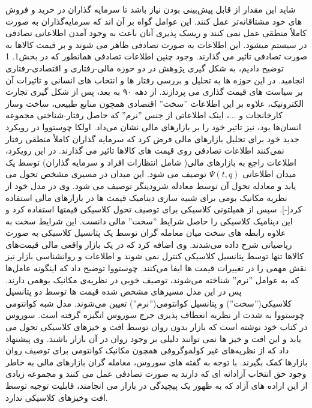 \documentclass[a4paper,titlepage,12pt,fleqn,oneside]{report}
\begin{document}
	شاید این مقدار از قابل پیش‌بینی بودن نیاز باشد تا سرمایه گذاران در خرید و فروش های خود مشتاقانه‌تر عمل کنند.  این عوامل گواه بر آن اند که سرمایه‌گذاران به صورت کاملاً منطقی عمل نمی کنند و ریسک پذیری آنان باعث به وجود آمدن اطلاعاتی تصادفی در سیستم میشود.  این اطلاعات به صورت تصادفی ظاهر می شوند و بر قیمت کالاها به صورت تصادفی تاثیر می گذارند.  وجود چنین اطلاعات تصادفی  همانطور که در بخش1. 1 توضیح دادیم، به شکل گیری پژوهش در دو حوزه مالی-رفتاری و اقتصادی-رفتاری انجامید. در این حوزه ها به تحلیل و بررسی رفتار ها و انتخاب های انسانی و تاثیرات آن بر سیاست های قیمت گذاری می پردازند. از دهه ۹۰ به بعد، پس از شکل گیری تجارت الکترونیک، علاوه بر این اطلاعات ''سخت'' اقتصادی همچون منابع  طبیعی، ساخت وساز کارخانجات و ...، اینک اطلاعاتی از جنس ''نرم'' که حاصل رفتار-شناختی مجموعه انسان‌ها بود،  نیز تاثیر خود را بر بازارهای مالی نشان می‌داد.  اولکا چوستووا در رویکرد جدید خود برای تحلیل بازارهای مالی فرض کرد که سرمایه گذاران کاملاً منطقی رفتار نمی‌کنند اطلاعات تصادفی روی قیمت های کالاها تاثیر می گذارند.  در این رویکرد،  اطلاعات راجع به بازارهای مالی( شامل انتظارات افراد و سرمایه گذاران)  توسط یک میدان اطلاعاتی $\Psi(t,q)$  توصیف می شود.  این میدان در مسیری مشخص تحول می یابد و معادله تحول آن توسط معادله شرودینگر توصیف می شود.  وی در مدل خود از نظریه مکانیک بومی برای  شبیه سازی دینامیک قیمت ها در بازارهای مالی استفاده کرد[-].  سپس از همیلتونی کلاسیکی برای توصیف تحول کلاسیکی قیمتها استفاده کرد و  این دینامیک کلاسیکی را حاصل شرایط ''سخت'' مالی دانست.  این شرایط سخت به علاوه رابطه های سخت میان معامله گران توسط یک پتانسیل کلاسیکی به صورت ریاضیاتی شرح داده می‌شدند.  وی اضافه کرد که در یک بازار واقعی مالی قیمت‌های کالاها تنها توسط پتانسیل کلاسیکی کنترل نمی شوند و اطلاعات و روانشناسی بازار نیز نقش مهمی را در تغییرات قیمت ها ایفا می‌کنند. چوستووا  توضیح داد که اینگونه عامل‌ها که به عوامل ''نرم'' شناخته می‌شوند، توصیف خوبی در نظریه‌ی مکانیک بوهمی ‌دارند.  پس در این مدل مسیرهای مشخص شده قیمت ها توسط دو پتانسیل کلاسیکی(''سخت'')  و پتانسیل کوانتومی(''نرم'') تعیین می‌شوند.  مدل شبه کوانتومی چوستووا به شدت از نظریه انعطاف پذیری جرج سوروس انگیزه گرفته است. سوروس در کتاب خود نوشته است که بازار بدون روان توسط افت و خیزهای کلاسیکی تحول می یابد و این افت و خیز ها نمی توانند دلیلی بر وجود روان در آن بازار باشند. وی  پیشنهاد داد که از نظریه‌های غیر کولموگروفی همچون مکانیک کوانتومی برای توصیف روان بازارها کمک بگیرند.   با توجه به گفته های سوروس،  معامله گران بازارهای مالی به خاطر وجود حق انتخاب آزادانه ای که دارند به صورت تصادفی عمل می کنند  و مجموعه زیادی از این اراده های آزاد که به ظهور یک پیچیدگی در بازار می انجامند، قابلیت توجیه توسط افت وخیزهای کلاسیکی ندارد.  
	
\end{document}
